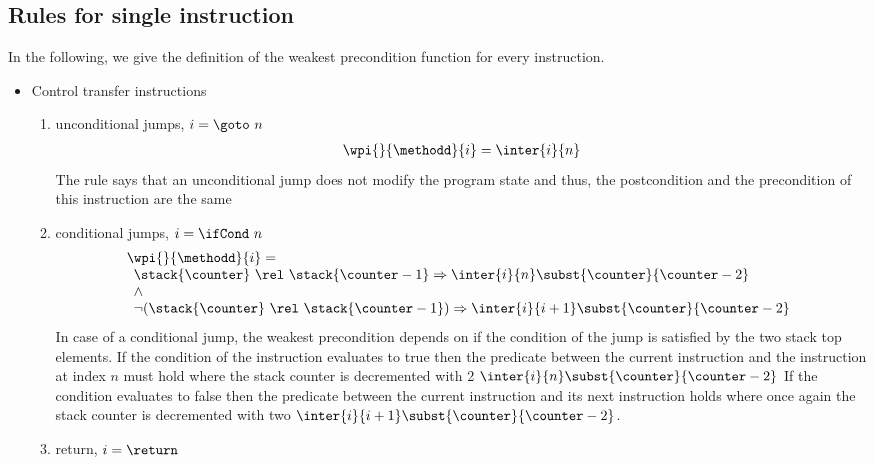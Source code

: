 \subsection{Rules for single instruction} \label{wp:singleInstr}
 In the following, we give the definition of the weakest precondition function for every instruction.


\begin{itemize}	
\item Control transfer instructions
\begin{enumerate}
 \item unconditional jumps, $i = \goto \  n  $ \\
  $$\begin{array}{l} \wpi{}{\methodd}{i} =   \inter{i}{n}  \end{array} $$
  The rule says that an unconditional jump does not modify the program state and thus, the postcondition and the precondition of this instruction
  are the same

\item conditional jumps,  $i = \ifCond \  n  $
  $$ \begin{array}{l}
          \wpi{ }{\methodd}{i} =\\
	   \begin{array}{l} 
                   \stack{\counter} \  \rel \ \stack{\counter - 1}  \Rightarrow  \inter{i}{n}\subst{\counter}{ \counter - 2 } \\
			 \wedge  \\
		  \neg ( \stack{\counter} \ \rel \ \stack{\counter - 1} )  \Rightarrow \inter{i}{i+1}\subst{\counter}{\counter - 2} 
           \end{array}
  \end{array}$$
   In case of a conditional jump, the weakest precondition depends on if  the condition of the jump is satisfied
   by the two stack top elements. %
   If the condition of the instruction evaluates to true then the predicate between the current instruction and
   the instruction at index $n$ must hold  where the stack counter is decremented with 2 $\inter{i}{n}\subst{\counter}{ \counter - 2} $ 
   If the condition evaluates to false then the predicate between the current instruction and its next instruction holds where once again the stack counter
   is decremented with two $ \inter{i}{i+1}\subst{\counter}{\counter - 2} $. 

 \item return,  $i = \return $
 

\end{enumerate}
\end{itemize}
